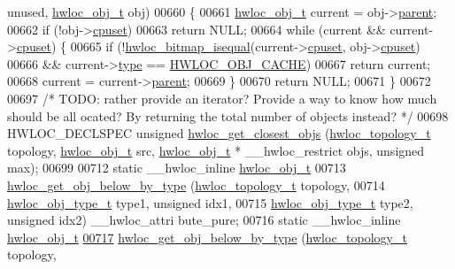 \begin{DoxyCode}
      unused, \hyperlink{a00016}{hwloc_obj_t} obj)
00660 \{
00661   \hyperlink{a00016}{hwloc_obj_t} current = obj->\hyperlink{a00016_adc494f6aed939992be1c55cca5822900}{parent};
00662   \textcolor{keywordflow}{if} (!obj->\hyperlink{a00016_a67925e0f2c47f50408fbdb9bddd0790f}{cpuset})
00663     \textcolor{keywordflow}{return} NULL;
00664   \textcolor{keywordflow}{while} (current && current->\hyperlink{a00016_a67925e0f2c47f50408fbdb9bddd0790f}{cpuset}) \{
00665     \textcolor{keywordflow}{if} (!\hyperlink{a00065_ga4dd6a75ab63d33ef33bd626b0e489388}{hwloc_bitmap_isequal}(current->\hyperlink{a00016_a67925e0f2c47f50408fbdb9bddd0790f}{cpuset}, obj->\hyperlink{a00016_a67925e0f2c47f50408fbdb9bddd0790f}{cpuset})
00666         && current->\hyperlink{a00016_acc4f0803f244867e68fe0036800be5de}{type} == \hyperlink{a00041_ggacd37bb612667dc437d66bfb175a8dc55a56ee0b7eca88f363b75b34fdde8c9ddc}{HWLOC_OBJ_CACHE})
00667       \textcolor{keywordflow}{return} current;
00668     current = current->\hyperlink{a00016_adc494f6aed939992be1c55cca5822900}{parent};
00669   \}
00670   \textcolor{keywordflow}{return} NULL;
00671 \}
00672 
00697 \textcolor{comment}{/* TODO: rather provide an iterator? Provide a way to know how much should be all
      ocated? By returning the total number of objects instead? */}
00698 HWLOC\_DECLSPEC \textcolor{keywordtype}{unsigned} \hyperlink{a00058_ga26c2ac4f25b1ed293249c88e232f1bea}{hwloc_get_closest_objs} (\hyperlink{a00039_ga9d1e76ee15a7dee158b786c30b6a6e38}{hwloc_topology_t} topology, 
      \hyperlink{a00016}{hwloc_obj_t} src, \hyperlink{a00016}{hwloc_obj_t} * \_\_hwloc\_restrict objs, \textcolor{keywordtype}{unsigned} max);
00699 
00712 \textcolor{keyword}{static} \_\_hwloc\_inline \hyperlink{a00016}{hwloc_obj_t}
00713 \hyperlink{a00058_ga6c482c2097f01b1ff88598fec8a1ba3b}{hwloc_get_obj_below_by_type} (\hyperlink{a00039_ga9d1e76ee15a7dee158b786c30b6a6e38}{hwloc_topology_t} topology,
00714                              \hyperlink{a00041_gacd37bb612667dc437d66bfb175a8dc55}{hwloc_obj_type_t} type1, \textcolor{keywordtype}{unsigned} idx1,
00715                              \hyperlink{a00041_gacd37bb612667dc437d66bfb175a8dc55}{hwloc_obj_type_t} type2, \textcolor{keywordtype}{unsigned} idx2) \_\_hwloc\_attri
      bute\_pure;
00716 \textcolor{keyword}{static} \_\_hwloc\_inline \hyperlink{a00016}{hwloc_obj_t}
\hypertarget{a00031_source_l00717}{}\hyperlink{a00058_ga6c482c2097f01b1ff88598fec8a1ba3b}{00717} \hyperlink{a00058_ga6c482c2097f01b1ff88598fec8a1ba3b}{hwloc_get_obj_below_by_type} (\hyperlink{a00039_ga9d1e76ee15a7dee158b786c30b6a6e38}{hwloc_topology_t} topology,

\end{DoxyCode}

